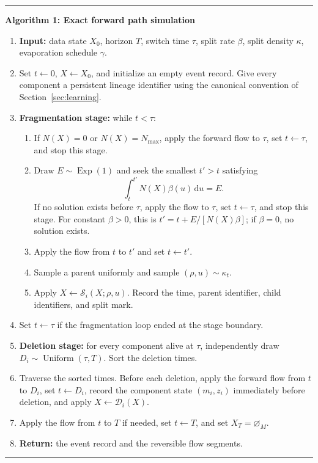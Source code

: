 \documentclass[10pt]{article}
\theoremstyle{definition}
\theoremstyle{remark}
\newcommand{\dd}{\,\mathrm{d}}
\newcommand{\emptyconfig}{\varnothing_M}
\newcommand{\splitmap}{\mathcal{S}}
\newcommand{\deathmap}{\mathcal{D}}
\newenvironment{algorithmblock}[1]
{\par\medskip\noindent\begin{minipage}{\linewidth}\hrule\medskip
 \noindent\textbf{#1}\par\smallskip\small}
{\par\medskip\hrule\end{minipage}\par\medskip}
\begin{document}
\begin{algorithmblock}{Algorithm 1: Exact forward path simulation}
\begin{enumerate}
  \item \textbf{Input:} data state $X_0$, horizon $T$, switch time $\tau$, split rate $\beta$, split density $\kappa$, evaporation schedule $\gamma$.
  \item Set $t\leftarrow0$, $X\leftarrow X_0$, and initialize an empty event
  record.  Give every component a persistent lineage identifier using the
  canonical convention of Section~\ref{sec:learning}.
  \item \textbf{Fragmentation stage:} while $t<\tau$:
  \begin{enumerate}
    \item If $N(X)=0$ or $N(X)=N_{\max}$, apply the forward flow to $\tau$,
    set $t\leftarrow\tau$, and stop this stage.
    \item Draw $E\sim\operatorname{Exp}(1)$ and seek the smallest $t'>t$
    satisfying
    \begin{equation*}
      \int_t^{t'}N(X)\beta(u)\dd u=E.
    \end{equation*}
    If no solution exists before $\tau$, apply the flow to $\tau$, set
    $t\leftarrow\tau$, and stop this stage.  For constant $\beta>0$, this is
    $t'=t+E/[N(X)\beta]$; if $\beta=0$, no solution exists.
    \item Apply the flow from $t$ to $t'$ and set $t\leftarrow t'$.
    \item Sample a parent uniformly and sample $(\rho,u)\sim\kappa_t$.
    \item Apply $X\leftarrow\splitmap_i(X;\rho,u)$.  Record the time, parent identifier, child identifiers, and split mark.
  \end{enumerate}
  \item Set $t\leftarrow\tau$ if the fragmentation loop ended at the stage
  boundary.
  \item \textbf{Deletion stage:} for every component alive at $\tau$, independently draw $D_i\sim\operatorname{Uniform}(\tau,T)$.  Sort the deletion times.
  \item Traverse the sorted times.  Before each deletion, apply the forward
  flow from $t$ to $D_i$, set $t\leftarrow D_i$, record the component state
  $(m_i,z_i)$ immediately before deletion, and apply
  $X\leftarrow\deathmap_i(X)$.
  \item Apply the flow from $t$ to $T$ if needed, set $t\leftarrow T$, and
  set $X_T=\emptyconfig$.
  \item \textbf{Return:} the event record and the reversible flow segments.
\end{enumerate}
\end{algorithmblock}
\end{document}
